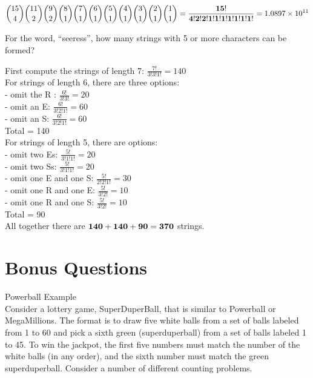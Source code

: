 \begin{questions}
\begin{parts}
\begin{solution}
    $\displaystyle \binom{15}{4} \binom{11}{2} \binom{9}{2} \binom{8}{1} \binom{7}{1} \binom{6}{1} \binom{5}{1} \binom{4}{1} \binom{3}{1} \binom{2}{1} \binom{1}{1} = 
    \mathbf{ \frac{15!}{4!2!2!1!1!1!1!1!1!1!} } = 1.0897 \times 10^{11}$
    \end{solution}


  \bonuspart[2] For the word, ``seeress'', how many strings with 5 or more characters can be formed?
  \ifprintanswers
    \vspace{-5pt}
  \fi
  \begin{solution}
  First compute the strings of length 7:  $\frac{7!}{3!3!1!} = 140$ \\
  For strings of length 6, there are three options: \\
    - omit the R :  $\frac{6!}{3!3!} = 20$ \\
    - omit an E:  $\frac{6!}{3!2!1!} = 60$ \\
    - omit an S:  $\frac{6!}{3!2!1!} = 60 $ \\
    Total = 140 \\[2pt]
  For strings of length 5, there are   options: \\
   - omit two Es: $\frac{5!}{3!1!1!} = 20$ \\
   - omit two Ss: $\frac{5!}{3!1!1!} = 20$ \\
   - omit one E and one S: $\frac{5!}{2!2!1!} = 30$ \\
   - omit one R and one E: $\frac{5!}{3!2!} = 10 $ \\
   - omit one R and one S: $\frac{5!}{3!2!} = 10 $ \\
   Total = 90 \\
   All together there are $\mathbf{ 140 + 140 + 90 = 370}$ strings.

  \end{solution}
\end{parts}



\section*{Bonus Questions} 


\bonusquestion[10] Powerball Example \\
Consider a lottery game, SuperDuperBall, that is similar to Powerball or MegaMillions.
The format is to draw five white balls from a set of balls labeled from 1 to 60
 and pick a sixth green (superduperball) from a set of balls labeled 1 to 45.  To win the
jackpot, the first five numbers must match the number of the white
balls (in any order), and the sixth number must match the green
superduperball.  Consider a number of different counting problems.
\begin{parts}

\end{parts}
\end{questions}
